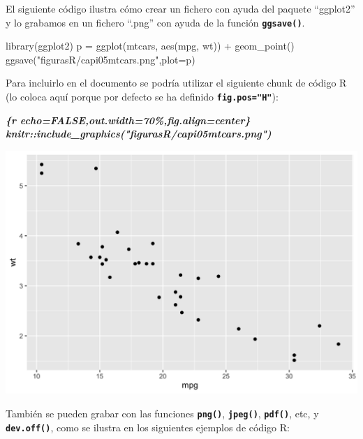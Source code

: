\documentclass[12pt,a4paper,oneside,]{article}
\newenvironment{Shaded}{\begin{snugshade}}{\end{snugshade}}
\newcommand{\AttributeTok}[1]{\textcolor[rgb]{0.77,0.63,0.00}{#1}}
\newcommand{\FunctionTok}[1]{\textcolor[rgb]{0.00,0.00,0.00}{#1}}
\newcommand{\InformationTok}[1]{\textcolor[rgb]{0.56,0.35,0.01}{\textbf{\textit{#1}}}}
\newcommand{\NormalTok}[1]{#1}
\newcommand{\OtherTok}[1]{\textcolor[rgb]{0.56,0.35,0.01}{#1}}
\newcommand{\SpecialCharTok}[1]{\textcolor[rgb]{0.00,0.00,0.00}{#1}}
\newcommand{\StringTok}[1]{\textcolor[rgb]{0.31,0.60,0.02}{#1}}
\numberwithin{dummy}{section}
\theoremstyle{ocrenumbox}
\theoremstyle{blacknumex}
\theoremstyle{blacknumbox}
\theoremstyle{ocrenum}
\theoremstyle{ocrenum}
\begin{document}
El siguiente código ilustra cómo crear un fichero con ayuda del paquete
``ggplot2'' y lo grabamos en un fichero ``.png'' con ayuda de la función
\textbf{\texttt{ggsave()}}.

\begin{Shaded}
\begin{Highlighting}[]
\FunctionTok{library}\NormalTok{(ggplot2)}
\NormalTok{p }\OtherTok{=} \FunctionTok{ggplot}\NormalTok{(mtcars, }\FunctionTok{aes}\NormalTok{(mpg, wt)) }\SpecialCharTok{+} 
  \FunctionTok{geom\_point}\NormalTok{()}
\FunctionTok{ggsave}\NormalTok{(}\StringTok{"figurasR/capi05mtcars.png"}\NormalTok{,}\AttributeTok{plot=}\NormalTok{p)}
\end{Highlighting}
\end{Shaded}

Para incluirlo en el documento se podría utilizar el siguiente chunk de
código R (lo coloca aquí porque por defecto se ha definido
\textbf{\texttt{fig.pos="H"}}):

\begin{Shaded}
\begin{Highlighting}[]
\InformationTok{\textasciigrave{}\textasciigrave{}\textasciigrave{}\{r echo=FALSE,out.width=\textquotesingle{}70\%\textquotesingle{},fig.align=\textquotesingle{}center\textquotesingle{}\}}
\InformationTok{knitr::include\_graphics("figurasR/capi05mtcars.png")}
\InformationTok{\textasciigrave{}\textasciigrave{}\textasciigrave{}}
\end{Highlighting}
\end{Shaded}

\begin{center}\includegraphics[width=0.7\linewidth]{figurasR/capi05mtcars} \end{center}

También se pueden grabar con las funciones \textbf{\texttt{png()}},
\textbf{\texttt{jpeg()}}, \textbf{\texttt{pdf()}}, etc, y
\textbf{\texttt{dev.off()}}, como se ilustra en los siguientes ejemplos
de código R:
\end{document}
